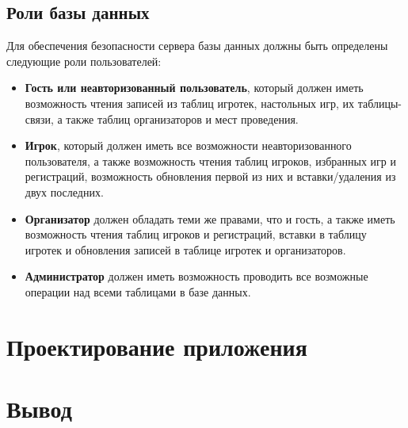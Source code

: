 
\subsection{Роли базы данных}

Для обеспечения безопасности сервера базы данных должны быть определены
следующие роли пользователей:

\begin{itemize}
    \item \textbf{Гость или неавторизованный пользователь}, который должен иметь
        возможность чтения записей из таблиц игротек, настольных игр, их
        таблицы-связи, а также таблиц организаторов и мест проведения.
    \item \textbf{Игрок}, который должен иметь все возможности неавторизованного
        пользователя, а также возможность чтения таблиц игроков, избранных игр и
        регистраций, возможность обновления первой из них и вставки/удаления из
        двух последних.
    \item \textbf{Организатор} должен обладать теми же правами, что и гость, а
        также иметь возможность чтения таблиц игроков и регистраций, вставки в
        таблицу игротек и обновления записей в таблице игротек и организаторов.
    \item \textbf{Администратор} должен иметь возможность проводить все
        возможные операции над всеми таблицами в базе данных.
\end{itemize}


\section{Проектирование приложения}
\section*{Вывод}

\clearpage
{}
~\\
~\\
~\\
